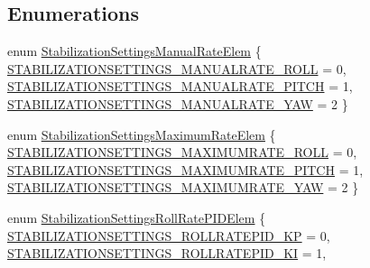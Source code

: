 \subsection*{\-Enumerations}
\begin{DoxyCompactItemize}
\item 
enum \hyperlink{group___stabilization_settings_gaffcee1c7a41452fa36b54ee57fdea925}{\-Stabilization\-Settings\-Manual\-Rate\-Elem} \{ \hyperlink{group___stabilization_settings_ggaffcee1c7a41452fa36b54ee57fdea925a01ff027f8575463bd8104fe16b2b82d6}{\-S\-T\-A\-B\-I\-L\-I\-Z\-A\-T\-I\-O\-N\-S\-E\-T\-T\-I\-N\-G\-S\-\_\-\-M\-A\-N\-U\-A\-L\-R\-A\-T\-E\-\_\-\-R\-O\-L\-L} = 0, 
\hyperlink{group___stabilization_settings_ggaffcee1c7a41452fa36b54ee57fdea925a1908297e1a9e761edce2271143159ebf}{\-S\-T\-A\-B\-I\-L\-I\-Z\-A\-T\-I\-O\-N\-S\-E\-T\-T\-I\-N\-G\-S\-\_\-\-M\-A\-N\-U\-A\-L\-R\-A\-T\-E\-\_\-\-P\-I\-T\-C\-H} = 1, 
\hyperlink{group___stabilization_settings_ggaffcee1c7a41452fa36b54ee57fdea925a61c8d8428f6354e8a79ec129031b7848}{\-S\-T\-A\-B\-I\-L\-I\-Z\-A\-T\-I\-O\-N\-S\-E\-T\-T\-I\-N\-G\-S\-\_\-\-M\-A\-N\-U\-A\-L\-R\-A\-T\-E\-\_\-\-Y\-A\-W} = 2
 \}
\item 
enum \hyperlink{group___stabilization_settings_gae4d93861899539ef053a462c46feaf08}{\-Stabilization\-Settings\-Maximum\-Rate\-Elem} \{ \hyperlink{group___stabilization_settings_ggae4d93861899539ef053a462c46feaf08a67011aa442475eb8a1a713e49a7dc607}{\-S\-T\-A\-B\-I\-L\-I\-Z\-A\-T\-I\-O\-N\-S\-E\-T\-T\-I\-N\-G\-S\-\_\-\-M\-A\-X\-I\-M\-U\-M\-R\-A\-T\-E\-\_\-\-R\-O\-L\-L} = 0, 
\hyperlink{group___stabilization_settings_ggae4d93861899539ef053a462c46feaf08a2ead8d699e5c4ed5d208bb09837e6e21}{\-S\-T\-A\-B\-I\-L\-I\-Z\-A\-T\-I\-O\-N\-S\-E\-T\-T\-I\-N\-G\-S\-\_\-\-M\-A\-X\-I\-M\-U\-M\-R\-A\-T\-E\-\_\-\-P\-I\-T\-C\-H} = 1, 
\hyperlink{group___stabilization_settings_ggae4d93861899539ef053a462c46feaf08a7aad507387f0c4407e12675ec90efb20}{\-S\-T\-A\-B\-I\-L\-I\-Z\-A\-T\-I\-O\-N\-S\-E\-T\-T\-I\-N\-G\-S\-\_\-\-M\-A\-X\-I\-M\-U\-M\-R\-A\-T\-E\-\_\-\-Y\-A\-W} = 2
 \}
\item 
enum \hyperlink{group___stabilization_settings_gac9a24f3cdca87b91642a61e8e5c589be}{\-Stabilization\-Settings\-Roll\-Rate\-P\-I\-D\-Elem} \{ \hyperlink{group___stabilization_settings_ggac9a24f3cdca87b91642a61e8e5c589bea731481d6b4c7a9319b778cd4db8ac6d8}{\-S\-T\-A\-B\-I\-L\-I\-Z\-A\-T\-I\-O\-N\-S\-E\-T\-T\-I\-N\-G\-S\-\_\-\-R\-O\-L\-L\-R\-A\-T\-E\-P\-I\-D\-\_\-\-K\-P} = 0, 
\hyperlink{group___stabilization_settings_ggac9a24f3cdca87b91642a61e8e5c589bea4b72bd50a34ac347cfb478a0b04dd155}{\-S\-T\-A\-B\-I\-L\-I\-Z\-A\-T\-I\-O\-N\-S\-E\-T\-T\-I\-N\-G\-S\-\_\-\-R\-O\-L\-L\-R\-A\-T\-E\-P\-I\-D\-\_\-\-K\-I} = 1, 

\end{DoxyCompactItemize}
